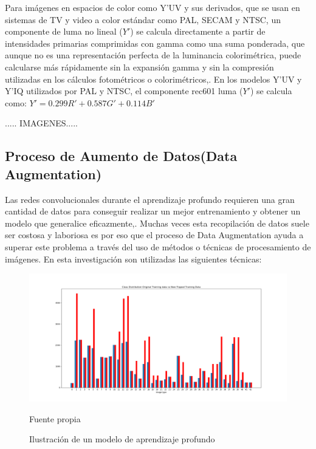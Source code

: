 Para imágenes en espacios de color como Y'UV y sus derivados, que se usan en sistemas de TV y video a color estándar como PAL, SECAM y NTSC, un componente de luma no lineal ($Y'$) se calcula directamente a partir de intensidades primarias comprimidas con gamma como una suma ponderada, que aunque no es una representación perfecta de la luminancia colorimétrica, puede calcularse más rápidamente sin la expansión gamma y sin la compresión utilizadas en los cálculos fotométricos o colorimétricos,\citep{POYNTON2003257}. En los modelos Y'UV y Y'IQ utilizados por PAL y NTSC, el componente rec601 luma ($Y'$) se calcula como:
$Y' = 0.299R' + 0.587G' + 0.114B'$


..... IMAGENES.....

\subsection{Proceso de Aumento de Datos(Data Augmentation)}

Las redes convolucionales durante el aprendizaje profundo requieren una gran cantidad de datos para conseguir realizar un mejor entrenamiento y obtener un modelo que generalice eficazmente,\citep{DL_augmentData}. Muchas veces esta recopilación de datos suele ser costosa y laboriosa es por eso que el proceso de Data Augmentation ayuda a superar este problema a través del uso de métodos o técnicas de procesamiento de imágenes. En esta investigación son utilizadas las siguientes técnicas:


\begin{figure}[H]
	\includegraphics[width=1.1\textwidth]{images/desarrollo/histograms/flippedImg_59698}
	\begin{center}
	\caption{\small{Ilustración de un modelo de aprendizaje profundo}}
	{\small{Fuente propia}}
	\end{center}
	\vspace{-1.5em}
\end{figure}